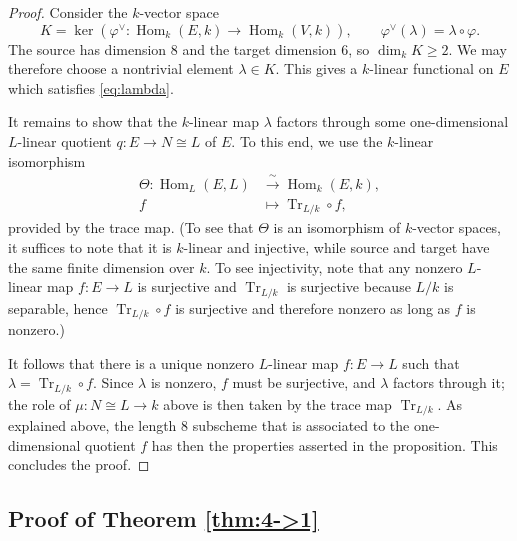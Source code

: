 \documentclass[a4paper,11pt]{amsart}
\numberwithin{equation}{section}
\theoremstyle{definition}
\theoremstyle{remark}
\begin{document}
\begin{proof}
Consider the $k$-vector space
\[
  K=\ker \left( \varphi^\vee \colon \operatorname{Hom}_k(E,k)
  \longrightarrow\operatorname{Hom}_k(V,k)
  \right),
  \qquad \varphi^\vee(\lambda)=\lambda\circ \varphi.
\]
The source has dimension $8$ and the target dimension $6$, so $\dim_k K\geq2$. 
We may therefore choose a nontrivial element $\lambda\in K$.
This gives a $k$-linear functional on $E$ which satisfies \eqref{eq:lambda}.

It remains to show that the $k$-linear map $\lambda$ factors through some one-dimensional $L$-linear quotient $q\colon E\to N\cong L$ of $E$. 
To this end, we use the $k$-linear isomorphism
\begin{equation}\label{eq:arithmetic-trace-duality}
  \begin{aligned}
  \Theta:\operatorname{Hom}_L(E,L)
  &\xrightarrow{\ \sim\ }\operatorname{Hom}_k(E,k),\\
  f&\mapsto \operatorname{Tr}_{L/k}\circ f ,
  \end{aligned}
\end{equation}
provided by the trace map. 
(To see that $\Theta$ is an isomorphism of $k$-vector spaces, it suffices to note that it is $k$-linear and injective, while source and target have the same finite dimension over $k$.
To see injectivity, note that any nonzero $L$-linear map $f\colon E\to L$ is surjective and $\operatorname{Tr}_{L/k}$ is surjective because $L/k$ is separable, hence $\operatorname{Tr}_{L/k}\circ f$ is surjective and therefore nonzero as long as $f$ is nonzero.)

It follows that there is a unique nonzero $L$-linear map $f\colon E\to L$ such that $\lambda=\operatorname{Tr}_{L/k}\circ f$.
Since $\lambda$ is nonzero, $f$ must be surjective, and $\lambda$ factors through it; the role of $\mu\colon N\cong L\to k$ above is then taken by the trace map $\operatorname{Tr}_{L/k}$.
As explained above, the length $8$ subscheme that is associated to the one-dimensional quotient $f$ has then the properties asserted in the proposition.
This concludes the proof.
\end{proof}
 

\subsection{Proof of Theorem \ref{thm:4->1}}
\end{document}
